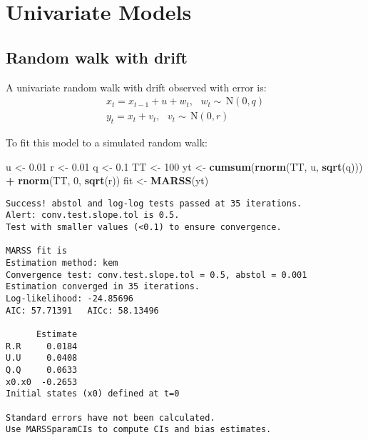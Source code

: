 \documentclass[12pt,]{book}
\newenvironment{Shaded}{\begin{snugshade}}{\end{snugshade}}
\newcommand{\DecValTok}[1]{\textcolor[rgb]{0.00,0.00,0.81}{#1}}
\newcommand{\FloatTok}[1]{\textcolor[rgb]{0.00,0.00,0.81}{#1}}
\newcommand{\KeywordTok}[1]{\textcolor[rgb]{0.13,0.29,0.53}{\textbf{#1}}}
\newcommand{\NormalTok}[1]{#1}
\newcommand{\OperatorTok}[1]{\textcolor[rgb]{0.81,0.36,0.00}{\textbf{#1}}}
\newcommand{\StringTok}[1]{\textcolor[rgb]{0.31,0.60,0.02}{#1}}
\begin{document}
\hypertarget{univariate-models}{%
\chapter{Univariate Models}\label{univariate-models}}

\hypertarget{random-walk-with-drift}{%
\section{Random walk with drift}\label{random-walk-with-drift}}

A univariate random walk with drift observed with error is:
\begin{equation}
\begin{gathered}
x_{t} = x_{t-1} + u + w_{t}, \text{ } w_t \sim \,\text{N}(0,q)  \\
y_{t} = x_{t} + v_{t}, \text{ } v_t \sim \,\text{N}(0,r)
\end{gathered}
\end{equation}

To fit this model to a simulated random walk: 

\begin{Shaded}
\begin{Highlighting}[]
\NormalTok{u <-}\StringTok{ }\FloatTok{0.01}
\NormalTok{r <-}\StringTok{ }\FloatTok{0.01}
\NormalTok{q <-}\StringTok{ }\FloatTok{0.1}
\NormalTok{TT <-}\StringTok{ }\DecValTok{100}
\NormalTok{yt <-}\StringTok{ }\KeywordTok{cumsum}\NormalTok{(}\KeywordTok{rnorm}\NormalTok{(TT, u, }\KeywordTok{sqrt}\NormalTok{(q))) }\OperatorTok{+}\StringTok{ }\KeywordTok{rnorm}\NormalTok{(TT, }\DecValTok{0}\NormalTok{, }\KeywordTok{sqrt}\NormalTok{(r))}
\NormalTok{fit <-}\StringTok{ }\KeywordTok{MARSS}\NormalTok{(yt)}
\end{Highlighting}
\end{Shaded}

\begin{verbatim}
Success! abstol and log-log tests passed at 35 iterations.
Alert: conv.test.slope.tol is 0.5.
Test with smaller values (<0.1) to ensure convergence.

MARSS fit is
Estimation method: kem 
Convergence test: conv.test.slope.tol = 0.5, abstol = 0.001
Estimation converged in 35 iterations. 
Log-likelihood: -24.85696 
AIC: 57.71391   AICc: 58.13496   
 
      Estimate
R.R     0.0184
U.U     0.0408
Q.Q     0.0633
x0.x0  -0.2653
Initial states (x0) defined at t=0

Standard errors have not been calculated. 
Use MARSSparamCIs to compute CIs and bias estimates.
\end{verbatim}
\end{document}
